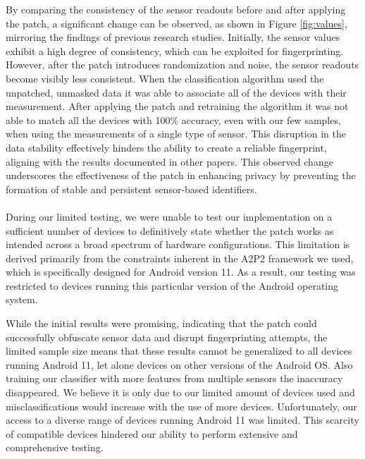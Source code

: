 \documentclass[11pt,
  oneside,openany,    %
]{scrreprt}
\begin{document}
By comparing the consistency of the sensor readouts before and after applying the patch, a significant change can be observed, as shown in Figure \ref{fig:values}, mirroring the findings of previous research studies. 
Initially, the sensor values exhibit a high degree of consistency, which can be exploited for fingerprinting.
However, after the patch introduces randomization and noise, the sensor readouts become visibly less consistent.
When the classification algorithm used the unpatched, unmasked data it was able to associate all of the devices with their measurement.
After applying the patch and retraining the algorithm it was not able to match all the devices with 100\% accuracy, even with our few samples, when using the measurements of a single type of sensor.  
This disruption in the data stability effectively hinders the ability to create a reliable fingerprint, aligning with the results documented in other papers.
This observed change underscores the effectiveness of the patch in enhancing privacy by preventing the formation of stable and persistent sensor-based identifiers.

\paragraph{}
During our limited testing, we were unable to test our implementation on a sufficient number of devices to definitively state whether the patch works as intended across a broad spectrum of hardware configurations.
This limitation is derived primarily from the constraints inherent in the A2P2 framework we used, which is specifically designed for Android version 11.
As a result, our testing was restricted to devices running this particular version of the Android operating system.

While the initial results were promising, indicating that the patch could successfully obfuscate sensor data and disrupt fingerprinting attempts, the limited sample size means that these results cannot be generalized to all devices running Android 11, let alone devices on other versions of the Android OS.
Also training our classifier with more features from multiple sensors the inaccuracy disappeared.
We believe it is only due to our limited amount of devices used and misclassifications would increase with the use of more devices.
Unfortunately, our access to a diverse range of devices running Android 11 was limited.
This scarcity of compatible devices hindered our ability to perform extensive and comprehensive testing.
\end{document}
